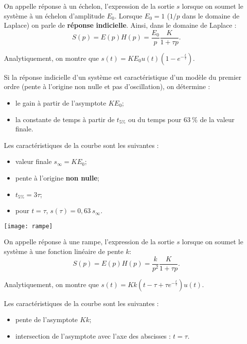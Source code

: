 \begin{resultat}

On appelle réponse à un échelon, l'expression de la sortie $s$ lorsque on soumet le système à un échelon d'amplitude $E_0$. Lorsque $E_0=1$ ($1/p$ dans le domaine de Laplace) on parle de \textbf{réponse indicielle}.
Ainsi, dans le domaine de Laplace :
$$
S(p)=E(p)H(p) = \dfrac{E_0}{p} \dfrac{K}{1+\tau p}.
$$ 

Analytiquement, on montre que $s(t)=K E_0 u(t) \left(1-e^{-\frac{t}{\tau}}\right)$. 

Si la réponse indicielle d'un système est caractéristique d'un modèle du premier ordre (pente à l'origine non nulle et pas d'oscillation), on détermine :
\begin{itemize}
\item le gain à partir de l'asymptote $K E_0$;
\item la constante de temps à partir de $t_{5\%}$ ou du temps pour $63~\%$ de la valeur finale.%
\end{itemize}
Les caractéristiques de la courbe sont les suivantes : 
\begin{itemize}
\item valeur finale $s_{\infty}=K E_0$;
\item pente à l'origine \textbf{non nulle};
\item $t_{5\%}=3\tau$;
\item pour $t=\tau$, $s(\tau)=0,63~ s_{\infty}$.
\end{itemize}
\end{resultat}




\begin{marginfigure}
\texttt{[image: rampe]}
\end{marginfigure}
\begin{resultat}

On appelle réponse à une rampe, l'expression de la sortie $s$ lorsque on soumet le système à une fonction linéaire de pente $k$: 
$$
S(p)=E(p)H(p) = \dfrac{k}{p^2} \dfrac{K}{1+\tau p}.
$$ 


Analytiquement, on montre que $s(t)=Kk \left(t-\tau+\tau e^{-\frac{t}{\tau}}\right)u(t)$. 

Les caractéristiques de la courbe sont les suivantes : 
\begin{itemize}
\item pente de l'asymptote $K k$;
\item intersection de l'asymptote avec l'axe des abscisses : $t=\tau$.
\end{itemize}
\end{resultat}


